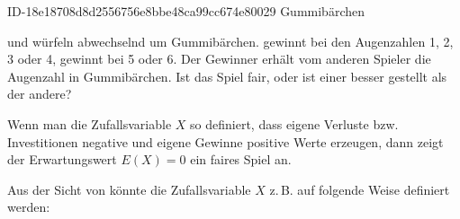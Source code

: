 \begin{exercise}
      {ID-18e18708d8d2556756e8bbe48ca99cc674e80029}
      {Gummibärchen}
  \ifproblem\problem\par
    \xya{} und \xxb{} würfeln abwechselnd um Gummibärchen. \xya{} gewinnt bei den
    Augenzahlen 1, 2, 3 oder 4, \xxb{} gewinnt bei 5 oder 6. Der Gewinner
    erhält vom anderen Spieler die Augenzahl in Gummibärchen. Ist das Spiel
    fair, oder ist einer besser gestellt als der andere?
  \fi
  \ifoutline\outline\par
    Wenn man die Zufallsvariable $X$ so definiert,
    dass eigene Verluste bzw. Investitionen
    negative und eigene Gewinne positive Werte
    erzeugen, dann zeigt der Erwartungswert $E(X)=0$
    ein faires Spiel an.\par
    Aus der Sicht von \xya{} könnte die Zufallsvariable
    $X$ z.\,B. auf folgende Weise definiert werden:
    \begingroup
      \newcommand{\dw}{2mm}%
      \newcommand{\dr}{1pt}%
      \newcommand{\dicea}%
      {%
        \begin{tikzpicture}%
          \draw (-\dw, -\dw) rectangle (\dw, \dw);
          \fill (0, 0) circle[radius=\dr];
        \end{tikzpicture}%
      }%
      \newcommand{\diceb}%
      {%
        \begin{tikzpicture}%
          \draw (-\dw, -\dw) rectangle (\dw, \dw);
          \fill (-0.33*\dw, -0.33*\dw) circle[radius=\dr];
          \fill ( 0.33*\dw,  0.33*\dw) circle[radius=\dr];
        \end{tikzpicture}%
      }%
      \newcommand{\dicec}%
      {%
        \begin{tikzpicture}%
          \draw (-\dw, -\dw) rectangle (\dw, \dw);
          \fill (-0.45*\dw, -0.45*\dw) circle[radius=\dr];
          \fill (        0,         0) circle[radius=\dr];
          \fill ( 0.45*\dw,  0.45*\dw) circle[radius=\dr];
        \end{tikzpicture}%
      }%
      \newcommand{\diced}%
      {%
        \begin{tikzpicture}%
          \draw (-\dw, -\dw) rectangle (\dw, \dw);
          \fill (-0.38*\dw,  0.38*\dw) circle[radius=\dr];
          \fill ( 0.38*\dw,  0.38*\dw) circle[radius=\dr];
          \fill (-0.38*\dw, -0.38*\dw) circle[radius=\dr];
          \fill ( 0.38*\dw, -0.38*\dw) circle[radius=\dr];
        \end{tikzpicture}%
      }%
      \newcommand{\dicee}%
      {%
        \begin{tikzpicture}%

\end{tikzpicture}}
\end{exercise}
